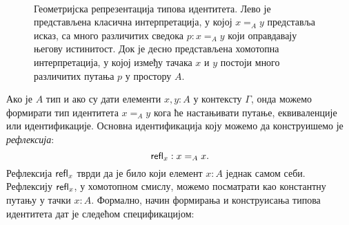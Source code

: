 \documentclass[12pt,oneside]{memoir}
\begin{document}
\begin{figure}[!ht]
    \centering\
    \label{fig:id_type}
    \begin{OnehalfSpace}
    \caption{Геометријска репрезентација типова идентитета. Лево је представљена класична интерпретација, у којој $x =_A y$ представља исказ, са много различитих сведока $p : x =_A y$ који оправдавају његову истинитост. Док је десно представљена хомотопна интерпретација, у којој између тачака $x$ и $y$ постоји много различитих путања $p$ у простору $A$. }
    \end{OnehalfSpace}
\end{figure}

\newpage%
Ако је $A$ тип и ако су дати елементи $x, y : A$ у контексту $\Gamma$, онда можемо формирати тип идентитета $x =_A y$ кога ће настањивати путање, еквиваленције или идентификације. Основна идентификација коју можемо да конструишемо је \emph{рефлексија}:
\[ \mathsf{refl}_{x} : x =_A x. \]
Рефлексија $\mathsf{refl}_{x}$ тврди да је било који елемент $x : A$ једнак самом себи. Рефлексију $\mathsf{refl}_{x}$, у хомотопном смислу, можемо посматрати као константну путању у тачки $x : A$. Формално, начин формирања и конструисања типова идентитета дат је следећом спецификацијом:
\end{document}
